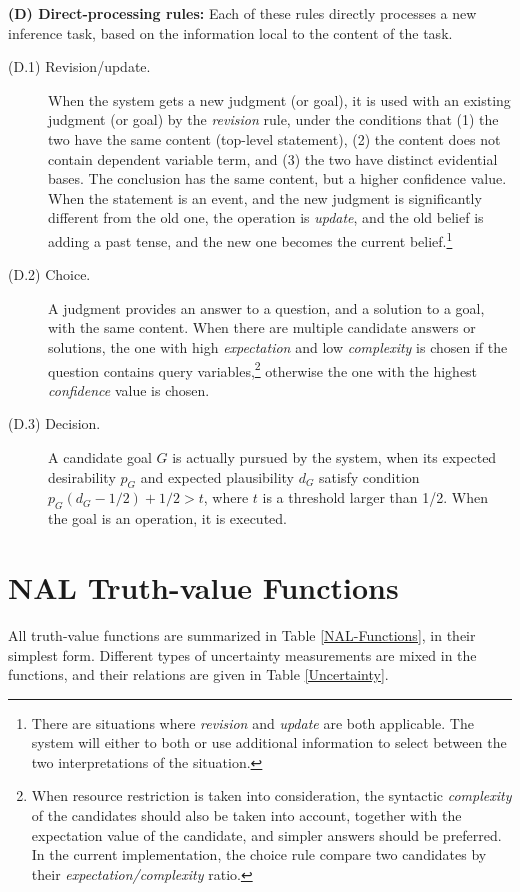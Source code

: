 \textbf{(D) Direct-processing rules:} Each of these rules directly processes a new inference task, based on the information local to the content of the task.
\begin{description}
	\item[(D.1) Revision/update.] When the system gets a new judgment (or goal), it is used with an existing judgment (or goal) by the \emph{revision} rule, under the conditions that (1) the two have the same content (top-level statement), (2) the content does not contain dependent variable term, and (3) the two have distinct evidential bases. The conclusion has the same content, but a higher confidence value. When the statement is an event, and the new judgment is significantly different from the old one, the operation is \emph{update}, and the old belief is adding a past tense, and the new one becomes the current belief.\footnote{There are situations where \emph{revision} and \emph{update} are both applicable. The system will either to both or use additional information to select between the two interpretations of the situation.}
  \item[(D.2) Choice.] A judgment provides an answer to a question, and a solution to a goal, with the same content. When there are multiple candidate answers or solutions, the one with high \emph{expectation} and low \emph{complexity} is chosen if the question contains query variables,\footnote{When resource restriction is taken into consideration, the syntactic \emph{complexity} of the candidates should also be taken into account, together with the expectation value of the candidate, and simpler answers should be preferred. In the current implementation, the choice rule compare two candidates by their \emph{expectation/complexity} ratio.} otherwise the one with the highest \emph{confidence} value is chosen.
  \item[(D.3) Decision.] A candidate goal $G$ is actually pursued by the system, when its expected desirability $p_G$ and expected plausibility $d_G$ satisfy condition \(p_G(d_G - 1/2) + 1/2 > t\), where $t$ is a threshold larger than 1/2. When the goal is an operation, it is executed.
\end{description}

\section{NAL Truth-value Functions}

All truth-value functions are summarized in Table \ref{NAL-Functions}, in their simplest form. Different types of uncertainty measurements are mixed in the functions, and their relations are given in Table \ref{Uncertainty}.

